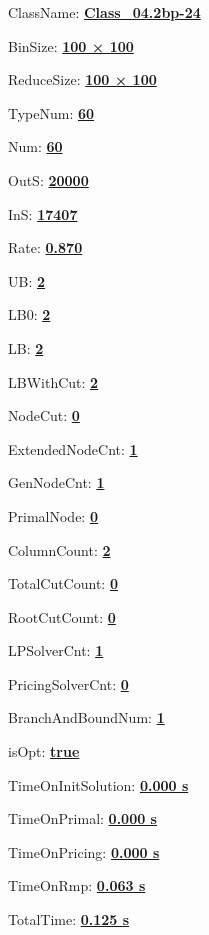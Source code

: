 \documentclass[11pt]{article}
\begin{document}
\pagestyle{empty}


ClassName: \underline{\textbf{Class_04.2bp-24}}
\par
BinSize: \underline{\textbf{100 × 100}}
\par
ReduceSize: \underline{\textbf{100 × 100}}
\par
TypeNum: \underline{\textbf{60}}
\par
Num: \underline{\textbf{60}}
\par
OutS: \underline{\textbf{20000}}
\par
InS: \underline{\textbf{17407}}
\par
Rate: \underline{\textbf{0.870}}
\par
UB: \underline{\textbf{2}}
\par
LB0: \underline{\textbf{2}}
\par
LB: \underline{\textbf{2}}
\par
LBWithCut: \underline{\textbf{2}}
\par
NodeCut: \underline{\textbf{0}}
\par
ExtendedNodeCnt: \underline{\textbf{1}}
\par
GenNodeCnt: \underline{\textbf{1}}
\par
PrimalNode: \underline{\textbf{0}}
\par
ColumnCount: \underline{\textbf{2}}
\par
TotalCutCount: \underline{\textbf{0}}
\par
RootCutCount: \underline{\textbf{0}}
\par
LPSolverCnt: \underline{\textbf{1}}
\par
PricingSolverCnt: \underline{\textbf{0}}
\par
BranchAndBoundNum: \underline{\textbf{1}}
\par
isOpt: \underline{\textbf{true}}
\par
TimeOnInitSolution: \underline{\textbf{0.000 s}}
\par
TimeOnPrimal: \underline{\textbf{0.000 s}}
\par
TimeOnPricing: \underline{\textbf{0.000 s}}
\par
TimeOnRmp: \underline{\textbf{0.063 s}}
\par
TotalTime: \underline{\textbf{0.125 s}}
\par
\newpage
\end{document}
